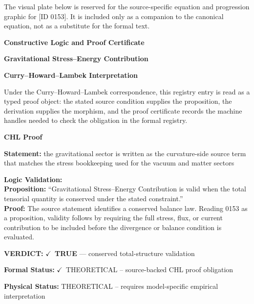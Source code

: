 \begingroup\footnotesize\sloppy
The visual plate below is reserved for the source-specific equation and progression graphic for [ID 0153]. It is included only as a companion to the canonical equation, not as a substitute for the formal text.
\par\endgroup
\ifTZPDarkEdition
{}
\fi

\clearpage
\begingroup\tzpsupportsetup
\noindent\textbf{\fontsize{10.8pt}{12.8pt}\selectfont [ID 0153] Constructive Logic and Proof Certificate}\par
\noindent\textbf{\fontsize{10pt}{12pt}\selectfont Gravitational Stress--Energy Contribution}\par
\vspace{0.45em}
\begingroup
\footnotesize
\setlength{\parskip}{0.22em}
\setlength{\parindent}{0pt}
\noindent\textbf{Curry--Howard--Lambek Interpretation}\par
Under the Curry--Howard--Lambek correspondence, this registry entry is read as a typed proof
object: the stated source condition supplies the proposition, the derivation supplies the
morphism, and the proof certificate records the machine handles needed to check the obligation
in the formal registry.

\vspace{0.45em}
\noindent\textbf{CHL Proof}\par
\textbf{Statement:} the gravitational sector is written as the curvature-side source term that matches the
stress bookkeeping used for the vacuum and matter sectors

\textbf{Logic Validation:}\\
\textbf{Proposition:} ``Gravitational Stress--Energy Contribution is valid when the total tensorial quantity is
conserved under the stated constraint.''\\
\textbf{Proof:} The source statement identifies a conserved balance law. Reading 0153 as a proposition,
validity follows by requiring the full stress, flux, or current contribution to be
included before the divergence or balance condition is evaluated.

\textbf{VERDICT:} \ensuremath{\checkmark}\ \textbf{TRUE} --- conserved total-structure validation

\textbf{Formal Status:} \ensuremath{\checkmark}\ THEORETICAL -- source-backed CHL proof obligation

\textbf{Physical Status:} THEORETICAL -- requires model-specific empirical interpretation
\par\vspace{0.45em}
\par
\ifTZPDarkEdition
{}
\fi
\endgroup
\endgroup
